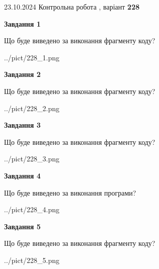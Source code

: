 \documentclass[12pt, ukrainian]{article}
\begin{document}
{\Large{23.10.2024 Контрольна робота , варіант  \No \textbf { 228 }\par}}
{
\begin {large}
{\begin {center}\textbf{Завдання 1}\end {center}}

Що буде виведено за виконання фрагменту коду?\par
\begin{center}
	{../pict/228_1.png}
\end{center}
\newpage

{\begin {center}\textbf{Завдання 2}\end {center}}

Що буде виведено за виконання фрагменту коду?\par
\begin{center}
	{../pict/228_2.png}
\end{center}
\newpage

{\begin {center}\textbf{Завдання 3}\end {center}}

Що буде виведено за виконання фрагменту коду?\par
\begin{center}
	{../pict/228_3.png}
\end{center}
\newpage

{\begin {center}\textbf{Завдання 4}\end {center}}

Що буде виведено за виконання програми?\par
\begin{center}
	{../pict/228_4.png}
\end{center}
\newpage

{\begin {center}\textbf{Завдання 5}\end {center}}

Що буде виведено за виконання фрагменту коду?\par
\begin{center}
	{../pict/228_5.png}
\end{center}
\newpage


\end{large}}
\end{document}
